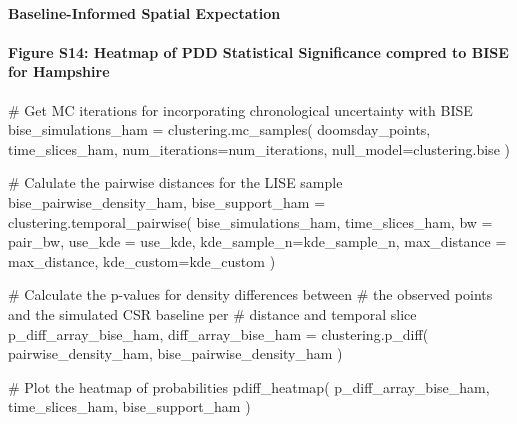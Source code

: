 \documentclass[
  11pt,
  letterpaper,
  DIV=11,
  numbers=noendperiod]{scrartcl}
\let\oldparagraph\paragraph
\renewcommand{\paragraph}[1]{\oldparagraph{#1}\mbox{}}
\newenvironment{Shaded}{\begin{snugshade}}{\end{snugshade}}
\newcommand{\CommentTok}[1]{\textcolor[rgb]{0.37,0.37,0.37}{#1}}
\newcommand{\NormalTok}[1]{\textcolor[rgb]{0.00,0.23,0.31}{#1}}
\newcommand{\OperatorTok}[1]{\textcolor[rgb]{0.37,0.37,0.37}{#1}}
\begin{document}
\paragraph{Baseline-Informed Spatial
Expectation}\label{baseline-informed-spatial-expectation-1}

\paragraph{Figure S14: Heatmap of PDD Statistical Significance compred
to BISE for
Hampshire}\label{figure-s14-heatmap-of-pdd-statistical-significance-compred-to-bise-for-hampshire}

\begin{Shaded}
\begin{Highlighting}[]
\CommentTok{\# Get MC iterations for incorporating chronological uncertainty with BISE}
\NormalTok{bise\_simulations\_ham }\OperatorTok{=}\NormalTok{ clustering.mc\_samples(}
\NormalTok{    doomsday\_points, }
\NormalTok{    time\_slices\_ham, }
\NormalTok{    num\_iterations}\OperatorTok{=}\NormalTok{num\_iterations,}
\NormalTok{    null\_model}\OperatorTok{=}\NormalTok{clustering.bise}
\NormalTok{)}

\CommentTok{\# Calulate the pairwise distances for the LISE sample}
\NormalTok{bise\_pairwise\_density\_ham, bise\_support\_ham }\OperatorTok{=}\NormalTok{ clustering.temporal\_pairwise(}
\NormalTok{    bise\_simulations\_ham, }
\NormalTok{    time\_slices\_ham, }
\NormalTok{    bw }\OperatorTok{=}\NormalTok{ pair\_bw, }
\NormalTok{    use\_kde }\OperatorTok{=}\NormalTok{ use\_kde,}
\NormalTok{    kde\_sample\_n}\OperatorTok{=}\NormalTok{kde\_sample\_n, }
\NormalTok{    max\_distance }\OperatorTok{=}\NormalTok{ max\_distance,}
\NormalTok{    kde\_custom}\OperatorTok{=}\NormalTok{kde\_custom}
\NormalTok{)}

\CommentTok{\# Calculate the p{-}values for density differences between }
\CommentTok{\# the observed points and the simulated CSR baseline per }
\CommentTok{\# distance and temporal slice}
\NormalTok{p\_diff\_array\_bise\_ham, diff\_array\_bise\_ham }\OperatorTok{=}\NormalTok{ clustering.p\_diff(}
\NormalTok{    pairwise\_density\_ham, }
\NormalTok{    bise\_pairwise\_density\_ham}
\NormalTok{)}

\CommentTok{\# Plot the heatmap of probabilities}
\NormalTok{pdiff\_heatmap(}
\NormalTok{    p\_diff\_array\_bise\_ham,}
\NormalTok{    time\_slices\_ham,}
\NormalTok{    bise\_support\_ham}
\NormalTok{)}
\end{Highlighting}
\end{Shaded}
\end{document}
